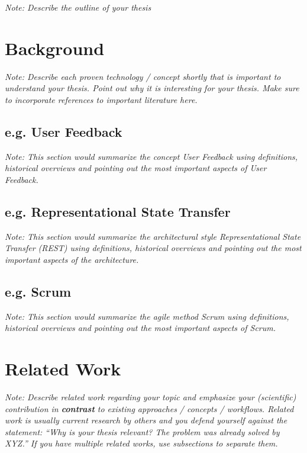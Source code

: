 \documentclass[a4paper,12pt,twoside]{report}
\begin{document}
\textit{Note: Describe the outline of your thesis}





\chapter{Background}

\textit{Note: Describe each proven technology / concept shortly that is important to understand your thesis. Point out why it is interesting for your thesis. Make sure to incorporate references to important literature here.}

\section{e.g. User Feedback}

\textit{Note: This section would summarize the concept User Feedback using definitions, historical overviews and pointing out the most important aspects of User Feedback.}

\section{e.g. Representational State Transfer}

\textit{Note: This section would summarize the architectural style Representational State Transfer (REST) using definitions, historical overviews and pointing out the most important aspects of the architecture.}

\section{e.g. Scrum}

\textit{Note: This section would summarize the agile method Scrum using definitions, historical overviews and pointing out the most important aspects of Scrum.}




\chapter{Related Work}

\textit{Note: Describe related work regarding your topic and emphasize your (scientific) contribution in \textbf{contrast} to existing approaches / concepts / workflows. Related work is usually current research by others and you defend yourself against the statement: ``Why is your thesis relevant? The problem was already solved by XYZ.'' If you have multiple related works, use subsections to separate them.}
\end{document}
